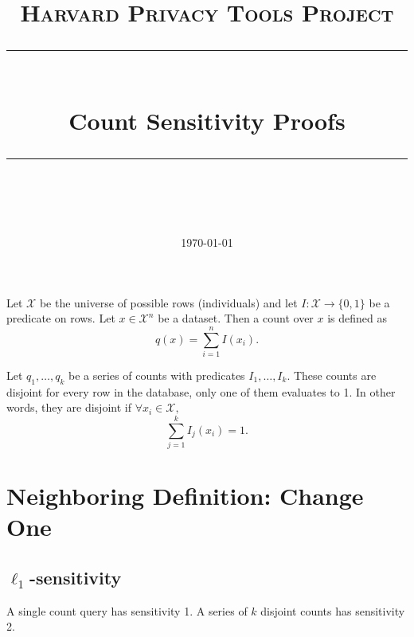 \documentclass[11pt]{scrartcl} %
\title{
	\normalfont\normalsize
	\textsc{Harvard Privacy Tools Project}\\ %
	\vspace{25pt} %
	\rule{\linewidth}{0.5pt}\\ %
	\vspace{20pt} %
	{\huge Count Sensitivity Proofs}\\ %
	\vspace{12pt} %
	\rule{\linewidth}{2pt}\\ %
	\vspace{12pt} %
}
\date{\normalsize\today} %
\begin{document}
\maketitle

\begin{definition}
Let $\mathcal{X}$ be the universe of possible rows (individuals) and let $I: \mathcal{X} \rightarrow \{0,1\}$ be a predicate on rows. Let $x \in \mathcal{X}^n$ be a dataset. Then a count over $x$ is defined as 
$$ q(x) = \sum_{i=1}^n I(x_i).$$
\end{definition}

\begin{definition}
Let $q_1, \ldots, q_k$ be a series of counts with predicates $I_1, \ldots, I_k$. These counts are disjoint for every row in the database, only one of them evaluates to 1. In other words, they are disjoint if $\forall x_i \in \mathcal{X},$ 
$$ \sum_{j=1}^k I_j(x_i) = 1.$$
\end{definition}

\section{Neighboring Definition: Change One}

\subsection{$\ell_1$-sensitivity}

\begin{theorem}
\label{thm:change1L1}
A single count query has sensitivity 1. A series of $k$ disjoint counts has sensitivity 2.
\end{theorem}
\end{document}
